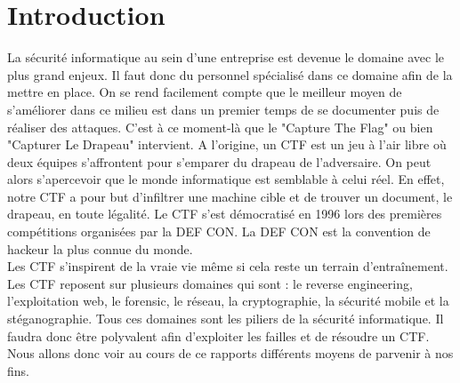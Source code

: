 \chapter*{Introduction}

La sécurité informatique au sein d’une entreprise est devenue le domaine avec le plus grand enjeux. Il faut donc du personnel spécialisé dans ce domaine afin de la mettre en place. On se rend facilement compte que le meilleur moyen de s’améliorer dans ce milieu est dans un premier temps de se documenter puis de réaliser des attaques. C’est à ce moment-là que le "Capture The Flag" ou bien "Capturer Le Drapeau" intervient. A l’origine, un CTF est un jeu à l’air libre où deux équipes s’affrontent pour s’emparer du drapeau de l’adversaire. On peut alors s’apercevoir que le monde informatique est semblable à celui réel. En effet, notre CTF a pour but d’infiltrer une machine cible et de trouver un document, le drapeau, en toute légalité. Le CTF s’est démocratisé en 1996 lors des premières compétitions organisées par la DEF CON. La DEF CON est la convention de hackeur la plus connue du monde. \\
Les CTF s’inspirent de la vraie vie même si cela reste un terrain d'entraînement. Les CTF reposent sur plusieurs domaines qui sont : le reverse engineering, l’exploitation web, le forensic, le réseau, la cryptographie, la sécurité mobile et la stéganographie.
Tous ces domaines sont les piliers de la sécurité informatique. Il faudra donc être polyvalent afin d’exploiter les failles et de résoudre un CTF. Nous allons donc voir au cours de ce rapports différents moyens de parvenir à nos fins.